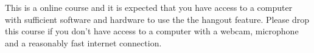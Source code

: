 This is a online course and it is expected that you have access to a
computer with sufficient software and hardware to use the the hangout
feature. Please drop this course if you don't have access to a computer with a webcam, microphone and a reasonably fast internet connection. 